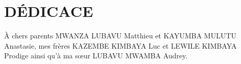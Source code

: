 \chapter*{DÉDICACE}
\centering
\large
À chers parents MWANZA LUBAVU Matthieu et KAYUMBA MULUTU Anastasie, mes frères KAZEMBE KIMBAYA Luc et LEWILE KIMBAYA Prodige ainsi qu'à ma sœur LUBAVU MWAMBA Audrey.